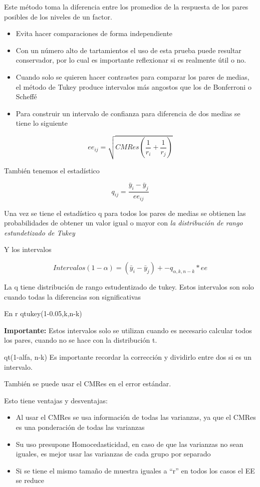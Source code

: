 \documentclass[
]{article}
\begin{document}
Este método toma la diferencia entre los promedios de la respuesta de
los pares posibles de los niveles de un factor.

\begin{itemize}
\item
  Evita hacer comparaciones de forma independiente
\item
  Con un número alto de tartamientos el uso de esta prueba puede
  resultar conservador, por lo cual es importante reflexionar si es
  realmente útil o no.
\item
  Cuando solo se quieren hacer contrastes para comparar los pares de
  medias, el método de Tukey produce intervalos más angostos que los de
  Bonferroni o Scheffé
\item
  Para construir un intervalo de confianza para diferencia de dos medias
  se tiene lo siguiente
\end{itemize}

\[
ee_{ij} = \sqrt{CMRes(\frac{1}{r_i}+\frac{1}{r_j})}
\]

También tenemos el estadístico

\[
q_{ij}=\frac{\bar y_i-\bar y_j}{ee_{ij}}
\]

Una vez se tiene el estadístico q para todos los pares de medias se
obtienen las probabilidades de obtener un valor igual o mayor con
\emph{la distribución de rango estundetizado de Tukey}

Y los intervalos

\[
Intervalos(1-\alpha)=(\bar y_i-\bar y_j) +- q_{\alpha,k,n-k}*ee
\]

La q tiene distribución de rango estudentizado de tukey. Estos
intervalos son solo cuando todas la diferencias son significativas

En r qtukey(1-0.05,k,n-k)

\textbf{Importante: } Estos intervalos solo se utilizan cuando es
necesario calcular todos los pares, cuando no se hace con la
distribución t.

qt(1-alfa, n-k) Es importante recordar la corrección y dividirlo entre
dos si es un intervalo.

También se puede usar el CMRes en el error estándar.

Esto tiene ventajas y desventajas:

\begin{itemize}
\item
  Al usar el CMRes se usa información de todas las varianzas, ya que el
  CMRes es una ponderación de todas las varianzas
\item
  Su uso presupone Homocedasticidad, en caso de que las varianzas no
  sean iguales, es mejor usar las varianzas de cada grupo por separado
\item
  Si se tiene el mismo tamaño de muestra iguales a ``r'' en todos los
  casos el EE se reduce
\end{itemize}
\end{document}
